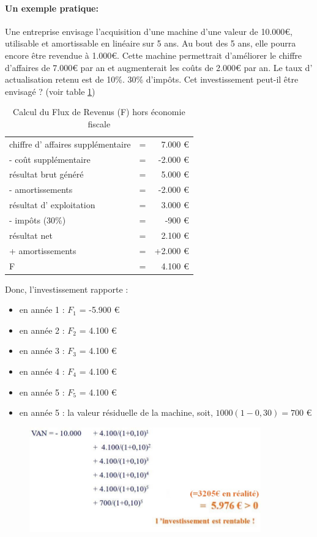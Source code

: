 \documentclass{article}
\begin{document}
\paragraph{Un exemple pratique:}
Une entreprise envisage l’acquisition d’une machine d’une valeur de 10.000\euro{}, utilisable et amortissable en linéaire sur 5 ans.
Au bout des 5 ans, elle pourra encore être revendue à 1.000\euro{}.
Cette machine permettrait d’améliorer le chiffre d’affaires de 7.000\euro{} par an et augmenterait les coûts de 2.000\euro{} par an. Le taux d’ actualisation retenu est de
10\%. 30\% d’impôts. Cet investissement peut-il être envisagé ? (voir table \ref{van})

\begin{table}[H]
\begin{tabular}{l c r}
	chiffre d’ affaires supplémentaire &=&	7.000 \euro{}\\
	- coût supplémentaire	&=&	-2.000 \euro{} \\
	\hline
	résultat brut généré	&=&	5.000 	\euro{}\\
	- amortissements	&=&	-2.000 	\euro{}\\
	\hline
	résultat d’	exploitation	&=&	3.000 \euro{}\\
	- impôts (30\%)	&=&	-900 	\euro{}\\
	\hline
	\color{red}résultat net	&\color{red}=&	\color{red}2.100 	\euro{}\\
	+ amortissements	&=&	+2.000 	\euro{}\\
	\hline
	\color{red}F	&\color{red}=&	\color{red}4.100 	\euro{}\\
\end{tabular}
\caption{\label{van} Calcul du Flux de Revenus (F) hors économie fiscale}
\end{table}

Donc, l’investissement rapporte :
\begin{itemize}
	\item en année 1 : $F_1$ = -5.900 \euro{}
	\item en année 2 : $F_2$	= 	4.100 \euro{}
	\item en année 3 : $F_3$	= 	4.100 \euro{}
	\item en année 4 :	$F_4$	= 	4.100 \euro{}
	\item en année 5 : $F_5$	= 	4.100 	\euro{}
	\item en année 5 : la valeur résiduelle de la machine, soit, $1000 (1-0,30) = 700$ \euro{}
\end{itemize}
\begin{figure}[H]
	\includegraphics[width=10cm]{van-rentabilite.jpg}
\end{figure}
\end{document}
